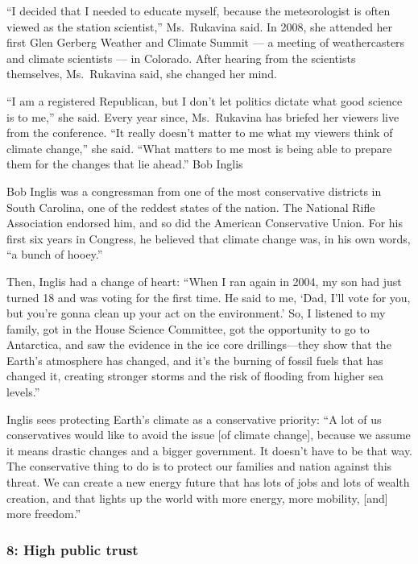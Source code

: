 \documentclass[
  letterpaper,
  DIV=11,
  numbers=noendperiod]{scrartcl}
\begin{document}
``I decided that I needed to educate myself, because the meteorologist
is often viewed as the station scientist,'' Ms.~Rukavina said. In 2008,
she attended her first Glen Gerberg Weather and Climate Summit --- a
meeting of weathercasters and climate scientists --- in Colorado. After
hearing from the scientists themselves, Ms.~Rukavina said, she changed
her mind.

``I am a registered Republican, but I don't let politics dictate what
good science is to me,'' she said. Every year since, Ms.~Rukavina has
briefed her viewers live from the conference. ``It really doesn't matter
to me what my viewers think of climate change,'' she said. ``What
matters to me most is being able to prepare them for the changes that
lie ahead.'' Bob Inglis

Bob Inglis was a congressman from one of the most conservative districts
in South Carolina, one of the reddest states of the nation. The National
Rifle Association endorsed him, and so did the American Conservative
Union. For his first six years in Congress, he believed that climate
change was, in his own words, ``a bunch of hooey.''

Then, Inglis had a change of heart: ``When I ran again in 2004, my son
had just turned 18 and was voting for the first time. He said to me,
`Dad, I'll vote for you, but you're gonna clean up your act on the
environment.' So, I listened to my family, got in the House Science
Committee, got the opportunity to go to Antarctica, and saw the evidence
in the ice core drillings---they show that the Earth's atmosphere has
changed, and it's the burning of fossil fuels that has changed it,
creating stronger storms and the risk of flooding from higher sea
levels.''

Inglis sees protecting Earth's climate as a conservative priority: ``A
lot of us conservatives would like to avoid the issue {[}of climate
change{]}, because we assume it means drastic changes and a bigger
government. It doesn't have to be that way. The conservative thing to do
is to protect our families and nation against this threat. We can create
a new energy future that has lots of jobs and lots of wealth creation,
and that lights up the world with more energy, more mobility, {[}and{]}
more freedom.''

\subsubsection{8: High public trust}\label{high-public-trust}
\end{document}
